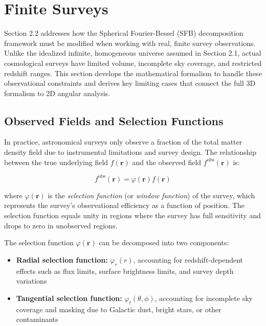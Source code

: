\section{Finite Surveys}

Section 2.2 addresses how the Spherical Fourier-Bessel (SFB) decomposition framework must be modified when working with real, finite survey observations. Unlike the idealized infinite, homogeneous universe assumed in Section 2.1, actual cosmological surveys have limited volume, incomplete sky coverage, and restricted redshift ranges. This section develops the mathematical formalism to handle these observational constraints and derives key limiting cases that connect the full 3D formalism to 2D angular analysis.

\subsection{Observed Fields and Selection Functions}

In practice, astronomical surveys only observe a fraction of the total matter density field due to instrumental limitations and survey design. The relationship between the true underlying field $f(\mathbf{r})$ and the observed field $f^{\text{obs}}(\mathbf{r})$ is:

\begin{equation}
f^{\text{obs}}(\mathbf{r}) = \varphi(\mathbf{r}) f(\mathbf{r})
\label{eq:observed_field}
\end{equation}

where $\varphi(\mathbf{r})$ is the \emph{selection function} (or \emph{window function}) of the survey, which represents the survey's observational efficiency as a function of position. The selection function equals unity in regions where the survey has full sensitivity and drops to zero in unobserved regions.

The selection function $\varphi(\mathbf{r})$ can be decomposed into two components:
\begin{itemize}
\item \textbf{Radial selection function:} $\varphi_r(r)$, accounting for redshift-dependent effects such as flux limits, surface brightness limits, and survey depth variations
\item \textbf{Tangential selection function:} $\varphi_t(\theta, \phi)$, accounting for incomplete sky coverage and masking due to Galactic dust, bright stars, or other contaminants
\end{itemize}

